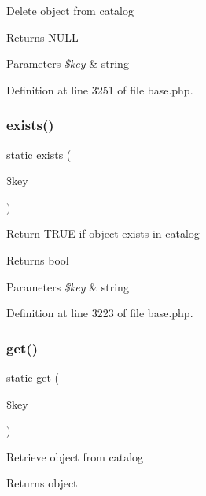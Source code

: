 Delete object from catalog \begin{DoxyReturn}{Returns}
N\+U\+LL 
\end{DoxyReturn}

\begin{DoxyParams}{Parameters}
{\em \$key} & string \\
\hline
\end{DoxyParams}


Definition at line 3251 of file base.\+php.

\hypertarget{class_registry_a1a924eadddd0dc6fd3f6604a2352d950}{}\label{class_registry_a1a924eadddd0dc6fd3f6604a2352d950} 
\subsubsection{\texorpdfstring{exists()}{exists()}}
{\footnotesize\ttfamily static exists (\begin{DoxyParamCaption}\item[{}]{\$key }\end{DoxyParamCaption})\hspace{0.3cm}{\ttfamily [static]}}

Return T\+R\+UE if object exists in catalog \begin{DoxyReturn}{Returns}
bool 
\end{DoxyReturn}

\begin{DoxyParams}{Parameters}
{\em \$key} & string \\
\hline
\end{DoxyParams}


Definition at line 3223 of file base.\+php.

\hypertarget{class_registry_a15e2679f2a8f6fa4d60757f4d65413ac}{}\label{class_registry_a15e2679f2a8f6fa4d60757f4d65413ac} 
\subsubsection{\texorpdfstring{get()}{get()}}
{\footnotesize\ttfamily static get (\begin{DoxyParamCaption}\item[{}]{\$key }\end{DoxyParamCaption})\hspace{0.3cm}{\ttfamily [static]}}

Retrieve object from catalog \begin{DoxyReturn}{Returns}
object 
\end{DoxyReturn}

